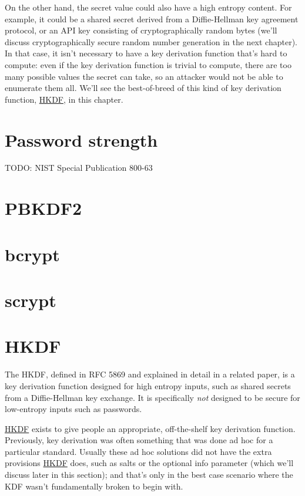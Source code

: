 \documentclass[11pt,ebook,table,dvipsnames]{memoir}
\begin{document}
On the other hand, the secret value could also have a high entropy
content. For example, it could be a shared secret derived from a
Diffie-Hellman key agreement protocol, or an API key consisting of
cryptographically random bytes (we'll discuss cryptographically secure
random number generation in the next chapter). In that case, it isn't
necessary to have a key derivation function that's hard to compute:
even if the key derivation function is trivial to compute, there are
too many possible values the secret can take, so an attacker would not
be able to enumerate them all. We'll see the best-of-breed of this
kind of key derivation function, \hyperref[HKDF]{HKDF}, in this chapter.
\section{Password strength}
\label{sec-2-9-2}

TODO: NIST Special Publication 800-63
\section{\label{PBKDF2}PBKDF2}
\label{sec-2-9-3}

\section{\label{bcrypt}bcrypt}
\label{sec-2-9-4}

\section{\label{scrypt}scrypt}
\label{sec-2-9-5}

\section{\label{HKDF}HKDF}
\label{sec-2-9-6}

The \gls{HKDF}, defined in RFC 5869\cite{rfc5869} and explained in
detail in a related paper\cite{hkdf}, is a key derivation function
designed for high entropy inputs, such as shared secrets from a
Diffie-Hellman key exchange. It is specifically \emph{not} designed to be
secure for low-entropy inputs such as passwords.

\hyperref[HKDF]{HKDF} exists to give people an appropriate, off-the-shelf key
derivation function. Previously, key derivation was often something
that was done ad hoc for a particular standard. Usually these ad hoc
solutions did not have the extra provisions \hyperref[HKDF]{HKDF} does, such as
\glspl{salt} or the optional info parameter (which we'll discuss later
in this section); and that's only in the best case scenario where the
KDF wasn't fundamentally broken to begin with.
\end{document}
